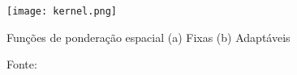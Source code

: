 \documentclass[12pt, a4paper, twoside]{report}
\numberwithin{equation}{section} %
\begin{document}



\begin{figure}[H]
    \centering
    \texttt{[image: kernel.png]}
\caption{Funções de ponderação espacial (a) Fixas (b) Adaptáveis }
\caption*{\footnotesize Fonte: \cite{fotheringham2002}}
\label{fig:fig0}
\end{figure}


\end{document}
